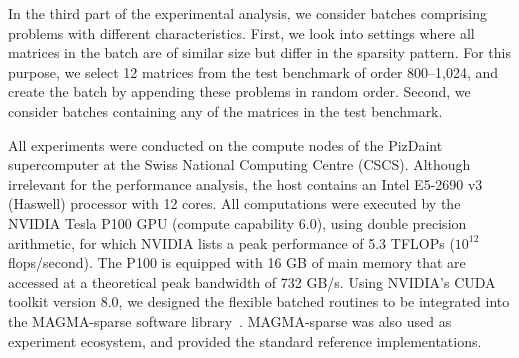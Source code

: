 In the third part of the experimental analysis, we consider batches comprising 
problems
with different characteristics. First, we look into settings where all matrices 
in the batch are of
similar size but differ in the sparsity pattern. For this purpose, we select 12 
matrices from
the test benchmark of order
800--1,024, and create the batch by appending these problems in random order.
Second, we consider batches containing any of the matrices in the test 
benchmark.

All experiments were conducted on the compute nodes of the 
PizDaint supercomputer at the Swiss National Computing Centre (CSCS). 
Although irrelevant for the performance analysis, the host contains
an Intel E5-2690 v3 (Haswell) processor with 12 cores.
All computations were executed by the NVIDIA Tesla P100 GPU (compute capability 
6.0),
using double precision arithmetic,
for which NVIDIA lists a peak performance of 5.3 TFLOPs ($10^{12}$ 
flops/second). 
The P100 is equipped with 16 GB of main memory that
are accessed at a theoretical peak bandwidth of 732 GB/s.
Using NVIDIA's CUDA toolkit version 8.0, we designed the flexible batched 
routines to be integrated into the MAGMA-sparse software 
library~\cite{parco2017}.
MAGMA-sparse was also used as experiment ecosystem, and provided
the standard \spmv reference implementations. 

